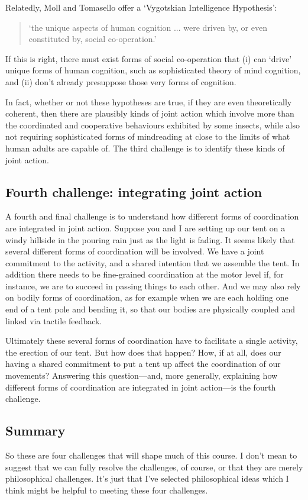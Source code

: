 \documentclass[12pt,\papersize]{extarticle}
\begin{document}
Relatedly, Moll and Tomasello offer a `Vygotskian Intelligence Hypothesis':
\begin{quote}
`the unique aspects of human cognition ... were driven by, or even constituted by, social co-operation.' \citep[p.\ 1]{Moll:2007gu}
\end{quote}
%
If this is right, there must exist forms of social co-operation that (i) can `drive' unique forms of human cognition, such as sophisticated theory of mind cognition, and (ii)  don't already presuppose those very forms of cognition.

In fact, whether or not these hypotheses are true, if they are even theoretically coherent, then there are plausibly kinds of joint  action which  involve more than the coordinated and cooperative behaviours exhibited by some insects, while also not requiring sophisticated forms of mindreading at close to the limits of what human adults are capable of.
The third challenge is to identify these kinds of joint action.


\subsection{Fourth challenge: integrating joint action}
A fourth and final challenge is to understand how different forms of coordination are integrated in joint action.
Suppose you and I are setting up our tent on a windy hillside in the pouring rain just as the light is fading.
It seems likely that several different forms of coordination will be involved.
We have a joint commitment to the activity, 
and a shared intention that we assemble the tent.
In addition there needs to be fine-grained coordination at the motor level if, for instance, we are to succeed in passing things to each other.
And we may also rely on bodily forms of coordination, as for example when we are each holding one end of a tent pole and bending it, so that our bodies are physically coupled and linked via tactile feedback.

Ultimately these several forms of coordination have to facilitate a single activity, the erection of our tent.
But how does that happen?
How, if at all, does our having a shared commitment to put a tent up affect the coordination of our movements? 
Answering this question---and, more generally, explaining how different forms of coordination are integrated in joint action---is the fourth challenge.

\subsection{Summary}
So these are four challenges that will shape much of this course.
I don't mean to suggest that we can fully resolve the challenges, of course, or that they are merely philosophical challenges.
It's just that I've selected philosophical ideas which I think might be helpful to meeting these four challenges.
\end{document}
